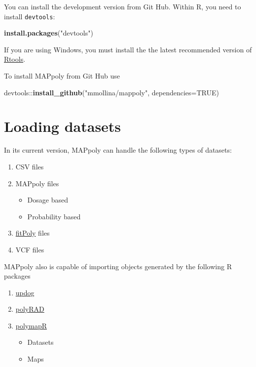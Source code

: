\documentclass[
]{article}
\newenvironment{Shaded}{}{}
\newcommand{\DataTypeTok}[1]{\textcolor[rgb]{0.56,0.13,0.00}{#1}}
\newcommand{\KeywordTok}[1]{\textcolor[rgb]{0.00,0.44,0.13}{\textbf{#1}}}
\newcommand{\NormalTok}[1]{#1}
\newcommand{\OperatorTok}[1]{\textcolor[rgb]{0.40,0.40,0.40}{#1}}
\newcommand{\OtherTok}[1]{\textcolor[rgb]{0.00,0.44,0.13}{#1}}
\newcommand{\StringTok}[1]{\textcolor[rgb]{0.25,0.44,0.63}{#1}}
\providecommand{\tightlist}{%
  \setlength{\itemsep}{0pt}\setlength{\parskip}{0pt}}
\begin{document}
You can install the development version from Git Hub. Within R, you need
to install \texttt{devtools}:

\begin{Shaded}
\begin{Highlighting}[]
\KeywordTok{install.packages}\NormalTok{(}\StringTok{"devtools"}\NormalTok{)}
\end{Highlighting}
\end{Shaded}

If you are using Windows, you must install the the latest recommended
version of
\href{https://cran.r-project.org/bin/windows/Rtools/}{Rtools}.

To install MAPpoly from Git Hub use

\begin{Shaded}
\begin{Highlighting}[]
\NormalTok{devtools}\OperatorTok{::}\KeywordTok{install_github}\NormalTok{(}\StringTok{"mmollina/mappoly"}\NormalTok{, }\DataTypeTok{dependencies=}\OtherTok{TRUE}\NormalTok{)}
\end{Highlighting}
\end{Shaded}

\hypertarget{loading-datasets}{%
\section{Loading datasets}\label{loading-datasets}}

In its current version, MAPpoly can handle the following types of
datasets:

\begin{enumerate}
\def\labelenumi{\arabic{enumi}.}
\tightlist
\item
  CSV files
\item
  MAPpoly files

  \begin{itemize}
  \tightlist
  \item
    Dosage based
  \item
    Probability based
  \end{itemize}
\item
  \href{https://CRAN.R-project.org/package=fitPoly}{fitPoly} files
\item
  VCF files
\end{enumerate}

MAPpoly also is capable of importing objects generated by the following
R packages

\begin{enumerate}
\def\labelenumi{\arabic{enumi}.}
\tightlist
\item
  \href{https://CRAN.R-project.org/package=updog}{updog}
\item
  \href{https://CRAN.R-project.org/package=polyRAD}{polyRAD}
\item
  \href{https://CRAN.R-project.org/package=polymapR}{polymapR}

  \begin{itemize}
  \tightlist
  \item
    Datasets
  \item
    Maps
  \end{itemize}
\end{enumerate}
\end{document}
